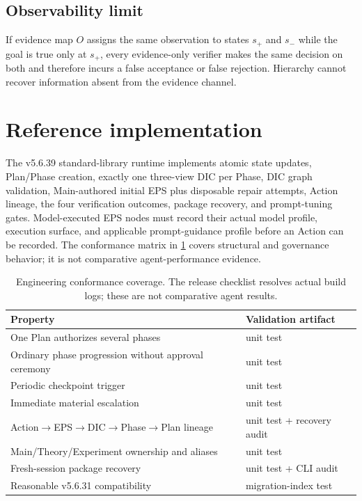 \documentclass{article}
\begin{document}
\subsection{Observability limit}
If evidence map $O$ assigns the same observation to states $s_+$ and $s_-$ while the goal is true only at $s_+$, every evidence-only verifier makes the same decision on both and therefore incurs a false acceptance or false rejection. Hierarchy cannot recover information absent from the evidence channel.

\section{Reference implementation}
The v5.6.39 standard-library runtime implements atomic state updates, Plan/Phase creation, exactly one three-view DIC per Phase, DIC graph validation, Main-authored initial EPS plus disposable repair attempts, Action lineage, the four verification outcomes, package recovery, and prompt-tuning gates. Model-executed EPS nodes must record their actual model profile, execution surface, and applicable prompt-guidance profile before an Action can be recorded. The conformance matrix in \cref{tab:tests} covers structural and governance behavior; it is not comparative agent-performance evidence.
\begin{table}[t]
\centering\small
\begin{tabularx}{\linewidth}{@{}X l@{}}
\toprule
Property & Validation artifact\\\midrule
One Plan authorizes several phases & unit test\\
Ordinary phase progression without approval ceremony & unit test\\
Periodic checkpoint trigger & unit test\\
Immediate material escalation & unit test\\
Action$\to$EPS$\to$DIC$\to$Phase$\to$Plan lineage & unit test + recovery audit\\
Main/Theory/Experiment ownership and aliases & unit test\\
Fresh-session package recovery & unit test + CLI audit\\
Reasonable v5.6.31 compatibility & migration-index test\\
\bottomrule
\end{tabularx}
\caption{Engineering conformance coverage. The release checklist resolves actual build logs; these are not comparative agent results.}
\label{tab:tests}
\end{table}
\end{document}
